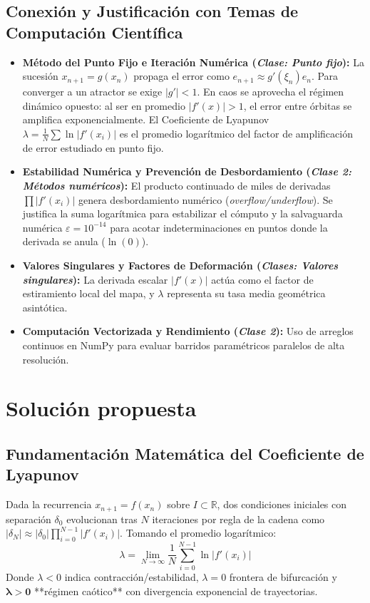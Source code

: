 \documentclass[11pt,letterpaper]{article}
\begin{document}
\subsection{Conexión y Justificación con Temas de Computación Científica}
\begin{itemize}
    \item \textbf{Método del Punto Fijo e Iteración Numérica (\textit{Clase: Punto fijo}):} La sucesión $x_{n+1} = g(x_n)$ propaga el error como $e_{n+1} \approx g'(\xi_n)e_n$. Para converger a un atractor se exige $|g'| < 1$. En caos se aprovecha el régimen dinámico opuesto: al ser en promedio $|f'(x)| > 1$, el error entre órbitas se amplifica exponencialmente. El Coeficiente de Lyapunov $\lambda = \frac{1}{N} \sum \ln |f'(x_i)|$ es el promedio logarítmico del factor de amplificación de error estudiado en punto fijo.
    \item \textbf{Estabilidad Numérica y Prevención de Desbordamiento (\textit{Clase 2: Métodos numéricos}):} El producto continuado de miles de derivadas $\prod |f'(x_i)|$ genera desbordamiento numérico (\textit{overflow/underflow}). Se justifica la suma logarítmica para estabilizar el cómputo y la salvaguarda numérica $\varepsilon = 10^{-14}$ para acotar indeterminaciones en puntos donde la derivada se anula ($\ln(0)$).
    \item \textbf{Valores Singulares y Factores de Deformación (\textit{Clases: Valores singulares}):} La derivada escalar $|f'(x)|$ actúa como el factor de estiramiento local del mapa, y $\lambda$ representa su tasa media geométrica asintótica.
    \item \textbf{Computación Vectorizada y Rendimiento (\textit{Clase 2}):} Uso de arreglos continuos en NumPy para evaluar barridos paramétricos paralelos de alta resolución.
\end{itemize}

\section{Solución propuesta}

\subsection{Fundamentación Matemática del Coeficiente de Lyapunov}
Dada la recurrencia $x_{n+1} = f(x_n)$ sobre $I \subset \mathbb{R}$, dos condiciones iniciales con separación $\delta_0$ evolucionan tras $N$ iteraciones por regla de la cadena como $|\delta_N| \approx |\delta_0| \prod_{i=0}^{N-1} |f'(x_i)|$. Tomando el promedio logarítmico:
\begin{equation}
    \lambda = \lim_{N \to \infty} \frac{1}{N} \sum_{i=0}^{N-1} \ln |f'(x_i)|
    \label{eq:lyapunov_def}
\end{equation}
Donde $\lambda < 0$ indica contracción/estabilidad, $\lambda = 0$ frontera de bifurcación y $\boldsymbol{\lambda > 0}$ **régimen caótico** con divergencia exponencial de trayectorias.
\end{document}
